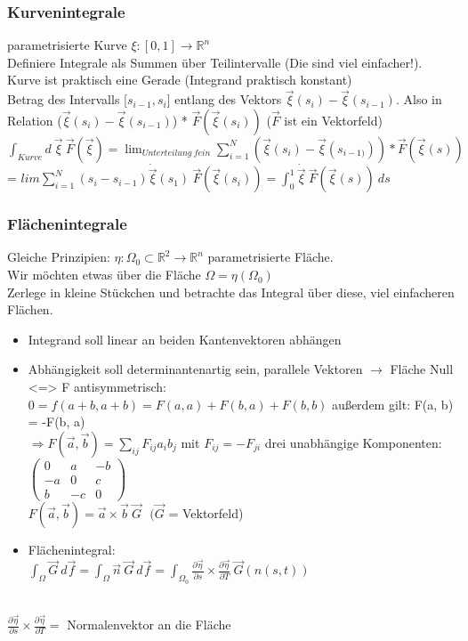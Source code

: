 \documentclass{article}
\begin{document}
\subsubsection{Kurvenintegrale}
parametrisierte Kurve $\xi: [0, 1] \longrightarrow \mathbb{R}^n$\\
Definiere Integrale als Summen über Teilintervalle (Die sind viel einfacher!).\\
Kurve ist praktisch eine Gerade (Integrand praktisch konstant)\\
Betrag des Intervalls [$s_{i-1}, s_i$] entlang des Vektors $\vec \xi(s_i) - \vec \xi(s_{i-1})$. Also in Relation ($\vec \xi(s_i) - \vec \xi(s_{i-1})$) * $\vec F(\vec \xi(s_i))$ ($\vec F$ ist ein Vektorfeld) \\
$\int_{Kurve} d ~\vec \xi ~ \vec F(\vec \xi) = \lim_{Unterteilung~fein} \sum_{i=1}^N (\vec \xi(s_i) - \vec \xi(s_{i-1)})) * \vec F(\vec \xi(s))$
 = $lim \sum_{i=1}^N (s_i-s_{i-1}) \dot{\vec \xi} (s_1) ~ \vec F(\vec \xi(s_i)) = \int_0^1 \dot{\vec \xi} ~ \vec F(\vec \xi(s)) ~ ds$
\subsubsection{Flächenintegrale}
Gleiche Prinzipien: $\eta: \Omega_0 \subset \mathbb{R}^2 \longrightarrow \mathbb{R}^n$ parametrisierte Fläche.\\
Wir möchten etwas über die Fläche $\Omega = \eta(\Omega_0)$\\
Zerlege in kleine Stückchen und betrachte das Integral über diese, viel einfacheren Flächen.
\begin{itemize}
\item Integrand soll linear an beiden Kantenvektoren abhängen 
\item Abhängigkeit soll determinantenartig sein, parallele Vektoren $\longrightarrow$ Fläche Null <=> F antisymmetrisch:\\
$0=f(a+b, a+b) = F(a, a) + F(b, a) + F(b, b)$ außerdem gilt: F(a, b) = -F(b, a)\\
$\Rightarrow F(\vec a, \vec b) = \sum_{ij} F_{ij} a_i b_j$ mit $F_{ij} = -F_{ji}$ drei unabhängige Komponenten: 
$
\begin{pmatrix}
0 & a & -b  \\
-a & 0 & c \\
b & -c & 0
\end{pmatrix}
$
\\
$F(\vec a, \vec b) = \vec a \times \vec b ~ \vec G ~~~(\vec G$ = Vektorfeld)\\
\item Flächenintegral:\\
$\int_\Omega \vec G~d\vec f = \int_\Omega \vec n ~\vec G ~ d\vec f = \int_{\Omega_0} \frac{\partial \vec \eta}{\partial s} \times \frac{\partial \vec \eta}{\partial T} ~ \vec G(n(s, t))$
\end{itemize}
\\
$\frac{\partial \vec \eta}{\partial s} \times \frac{\partial \vec \eta}{\partial T} =$ Normalenvektor an die Fläche
\end{document}
